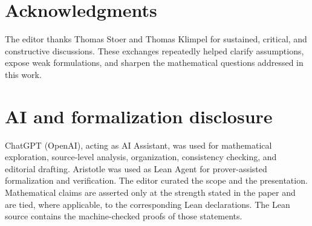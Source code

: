 \documentclass[11pt,a4paper]{article}
\theoremstyle{definition}
\theoremstyle{remark}
\begin{document}
\clearpage
\section*{Acknowledgments}

The editor thanks Thomas Stoer and Thomas Klimpel for sustained, critical,
and constructive discussions.  These exchanges repeatedly helped clarify
assumptions, expose weak formulations, and sharpen the mathematical
questions addressed in this work.

\section*{AI and formalization disclosure}

ChatGPT (OpenAI), acting as AI Assistant, was used for mathematical
exploration, source-level analysis, organization, consistency checking, and
editorial drafting.  Aristotle was used as Lean Agent for prover-assisted
formalization and verification.  The editor curated the scope and the
presentation.  Mathematical claims are asserted only at the strength stated
in the paper and are tied, where applicable, to the corresponding Lean declarations.  The Lean source contains the machine-checked proofs of those statements.
\end{document}
